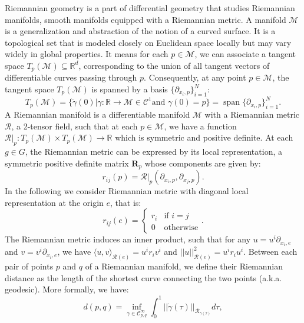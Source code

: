 \documentclass{article}
\DeclareMathOperator{\spn}{span}
\begin{document}
Riemannian geometry is a part of differential geometry that studies Riemannian manifolds, smooth manifolds equipped with a Riemannian metric. A manifold $\mathcal{M}$ is a generalization and abstraction of the notion of a curved surface. It is a topological set that is modeled closely on Euclidean space locally but may vary widely in global properties. It means for each $p \in \mathcal{M}$, we can associate a tangent space $T_p(\mathcal{M}) \subseteq \mathbb{R}^d$, corresponding to the union of all tangent vectors of differentiable curves passing through $p$. Consequently, at any point $p \in \mathcal{M}$, the tangent space $T_p(\mathcal{M})$ is spanned by a basis $\{\partial_{x_i, p} \}_{i=1}^N$:
\begin{equation}
T_p(\mathcal{M}) = \{ \dot{\gamma}(0) | \gamma : \mathbb{R} \to \mathcal{M} \in \mathcal{C}^1 \text{and } \gamma(0) = p\} = \spn\{\partial_{x_i,p} \}_{i=1}^N.
\end{equation}
A Riemannian manifold is a differentiable manifold $\mathcal{M}$ with a Riemannian metric $\mathcal{R}$, a 2-tensor field, such that at each $p \in \mathcal{M}$, we have a function $\mathcal{R}|_p : T_p (\mathcal{M}) \times T_p(\mathcal{M}) \to \mathbb{R}$ which is symmetric and positive definite. At each $g \in G$, the Riemannian metric can be expressed by its local representation, a symmetric positive definite matrix $\boldsymbol{R}_p$ whose components are given by:
\begin{equation}
r_{ij}(p) = \mathcal{R}|_p (\partial_{x_i, p}, \partial_{x_j, p}).
\end{equation}
In the following we consider Riemannian metric with  diagonal local representation at the origin $e$, that is:
\begin{equation}
r_{ij}(e) = \left\{
    \begin{array}{ll}
        r_{i} & \text{if } i = j  \\
        0 & \text{otherwise}
    \end{array}
\right..
\end{equation}
The Riemannian metric induces an inner product, such that for any $u = u^i \partial_{x_i, e}$ and $v = v^i \partial_{x_i, e}$, we have $\langle u, v \rangle_{\mathcal{R}(e)} = u^i r_i v^i$ and $|| u ||_{\mathcal{R}(e)}^2 = u^i r_i u^i$. Between each pair of points $p$ and $q$ of a Riemannian manifold, we define their Riemannian distance as the length of the shortest curve connecting the two points (a.k.a. geodesic). More formally, we have:
\begin{equation}
d(p, q) = \inf_{\gamma \in \mathcal{C}^\infty_{p, q}} \int_0^1 ||\dot{\gamma}(\tau)||_{\mathcal{R}_{\gamma(\tau)}} d\tau,
\end{equation}
\end{document}
